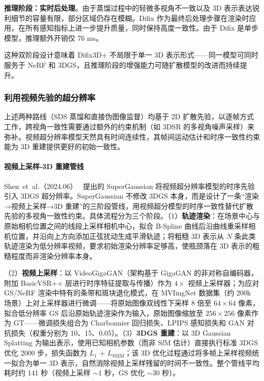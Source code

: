 \textbf{推理阶段：实时后处理}。由于蒸馏过程中的轻微多视角不一致以及 3D 表示表达锐利细节的容量有限，部分区域仍存在模糊。Difix 作为最终后处理步骤在渲染时应用，在所有感知指标上进一步提升质量，同时保持高度一致性。由于 Difix 是单步模型，推理额外开销仅 76 ms。

这种双阶段设计意味着 Difix3D+ 不局限于单一 3D 表示形式——同一模型可同时服务于 NeRF 和 3DGS，且推理阶段的增强能力可随扩散模型的改进而持续提升。

\subsubsection{利用视频先验的超分辨率}

上述两种路线（SDS 蒸馏和直接伪图像监督）均基于 2D 扩散先验，以逐帧方式工作，跨视角一致性需要通过额外的约束机制（如 3DSR 的多视角噪声采样）来弥补。视频超分辨率模型天然具有时间连续性，其帧间运动估计和时序一致性约束能为 3D 重建提供更好的初始一致性。

\paragraph{视频上采样-3D 重建管线}

Shen~et~al.（2024.06）~\cite{2406_00609} 提出的 SuperGaussian 将视频超分辨率模型的时序先验引入 3DGS 超分辨率。SuperGaussian 不修改 3DGS 本身，而是设计了一条“渲染→视频上采样→3D 重建”的三阶段管线，用视频超分模型的时序一致性替代扩散先验的多视角一致性约束。具体流程分为三个阶段。（1）\textbf{轨迹渲染}：在场景中心与原始相机位置之间的线段上采样相机中心，拟合 B-Spline 曲线后沿曲线重采样相机位置，并沿向上方向添加正弦扰动生成平滑轨迹；将粗糙 3D 表示从 $N$ 条此类轨迹渲染为低分辨率视频，要求初始渲染分辨率足够高，使瓶颈落在 3D 表示的粗糙程度而非渲染分辨率本身。

（2）\textbf{视频上采样}：以 VideoGigaGAN（架构基于 GigaGAN 的非对称自编码器，附加 BasicVSR++ 层进行时序特征提取与传播）作为 $4\times$ 视频上采样器；为应对 GS/NeRF 渲染中特有的条带和斑块退化模式，在 MVImgNet 数据集（约 200k 场景）上对上采样器进行微调——将原始图像双线性下采样 8 倍至 $64\times 64$ 像素，拟合低分辨率 GS 后沿原始轨迹渲染作为输入，原始图像缩放至 $256\times 256$ 像素作为 GT——微调损失组合为 Charbonnier 回归损失、LPIPS 感知损失和 GAN 对抗损失（权重分别为 10、15、0.05）。（3）\textbf{3DGS 重建}：以 3D Gaussian Splatting 为输出表示，使用已知相机参数（而非 SfM 估计）直接执行标准 3DGS 优化 2000 步，损失函数为 $L_1$ + $L_{\text{SSIM}}$；该 3D 优化过程通过将多帧上采样视频统一拟合为单一 3D 表示，自然消除视频上采样残留的时间不一致性。整个管线平均耗时约 141 秒（视频上采样 $\sim$1 秒，GS 优化 $\sim$30 秒）。

